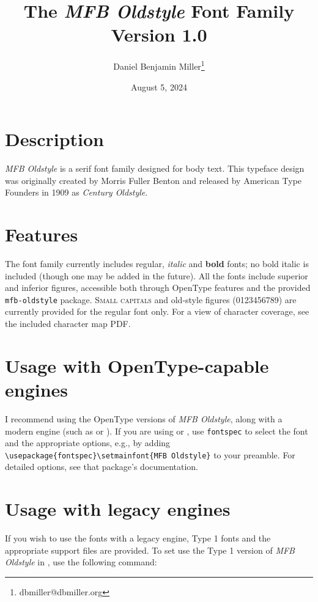 \documentclass[12pt]{article}
\title{The \textit{MFB Oldstyle} Font Family\\\large Version 1.0}
\date{August 5, 2024}
\author{Daniel Benjamin Miller\thanks{dbmiller@dbmiller.org}}
\begin{document}
\maketitle

\section{Description}

\textit{MFB Oldstyle} is a serif font family designed for body text. This typeface design was originally created by Morris Fuller Benton and released by American Type Founders in 1909 as \textit{Century Oldstyle}.

\section{Features}

The font family currently includes regular, \textit{italic} and \textbf{bold} fonts; no bold italic is included (though one may be added in the future). All the fonts include superior and inferior figures, accessible both through OpenType features and the provided \texttt{mfb-oldstyle}  package. \textsc{Small capitals} and old-style figures ({0123456789}) are currently provided for the regular font only. For a view of character coverage, see the included character map PDF.

\section{Usage with OpenType-capable  engines}

I recommend using the OpenType versions of \textit{MFB Oldstyle}, along with a modern  engine (such as  or ). If you are using  or , use \texttt{fontspec} to select the font and the appropriate options, e.g., by adding \texttt{\textbackslash usepackage\{fontspec\}\textbackslash setmainfont\{MFB Oldstyle\}} to your preamble. For detailed options, see that package's documentation.

\section{Usage with legacy  engines}

If you wish to use the fonts with a legacy  engine, Type 1 fonts and the appropriate support files are provided. To set use the Type 1 version of \textit{MFB Oldstyle} in , use the following command:
\end{document}

